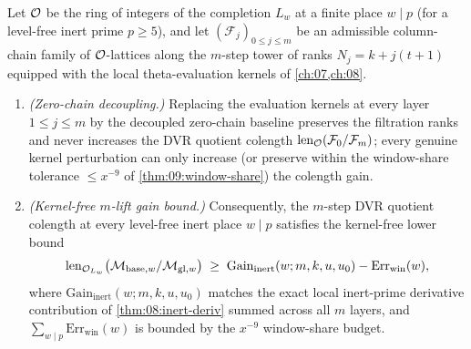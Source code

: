 \begin{theorem}
\label{thm:09:kernel-free-gain}
Let $\mathcal{O}$ be the ring of integers of the completion $L_w$ at a finite place $w \mid p$ (for a level-free inert prime $p \ge 5$), and let $(\mathcal{F}_j)_{0 \le j \le m}$ be an admissible column-chain family of $\mathcal{O}$-lattices along the $m$-step tower of ranks $N_j = k + j(t+1)$ equipped with the local theta-evaluation kernels of \cref{ch:07,ch:08}.
\begin{enumerate}[label=\textup{(\roman*)}]
\item \emph{(Zero-chain decoupling.)} Replacing the evaluation kernels at every layer $1 \le j \le m$ by the decoupled zero-chain baseline preserves the filtration ranks and never increases the DVR quotient colength $\operatorname{len}_{\mathcal{O}}(\mathcal{F}_0 / \mathcal{F}_m)$; every genuine kernel perturbation can only increase (or preserve within the window-share tolerance $\le x^{-9}$ of \cref{thm:09:window-share}) the colength gain.
\item \emph{(Kernel-free $m$-lift gain bound.)} Consequently, the $m$-step DVR quotient colength at every level-free inert place $w \mid p$ satisfies the kernel-free lower bound
  \begin{equation}
  \label{eq:09:kernel-free-bound}
    \operatorname{len}_{\mathcal{O}_{L_w}}\bigl(\mathcal{M}_{\mathrm{base}, w} / \mathcal{M}_{\mathrm{gl}, w}\bigr)
    \;\ge\; \mathrm{Gain}_{\mathrm{inert}}(w; m, k, u, u_0) - \mathrm{Err}_{\mathrm{win}}(w),
  \end{equation}
  where $\mathrm{Gain}_{\mathrm{inert}}(w; m, k, u, u_0)$ matches the exact local inert-prime derivative contribution of \cref{thm:08:inert-deriv} summed across all $m$ layers, and $\sum_{w \mid p} \mathrm{Err}_{\mathrm{win}}(w)$ is bounded by the $x^{-9}$ window-share budget.
\end{enumerate}
\end{theorem}

